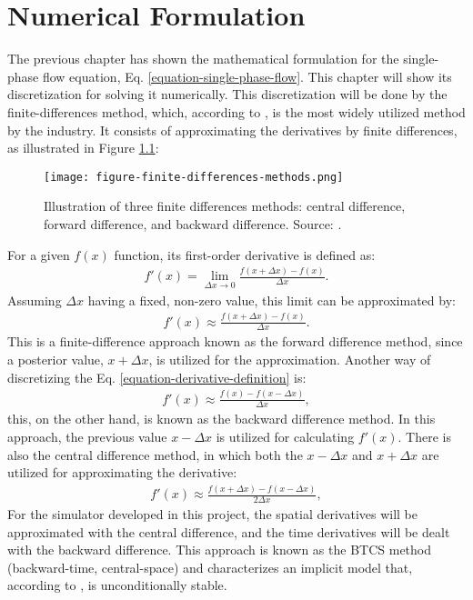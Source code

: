 \chapter{Numerical Formulation}
\label{chapter-numerical-formulation}

The previous chapter has shown the mathematical formulation for the single-phase flow equation, Eq. \ref{equation-single-phase-flow}.
%
This chapter will show its discretization for solving it numerically.
%
This discretization will be done by the finite-differences method, which, according to \cite{Ertekin2001}, is the most widely utilized method by the industry.
%
It consists of approximating the derivatives by finite differences, as illustrated in Figure \ref{figure-finite-differences-methods}:
%
\begin{figure}[H]
	\centering
	\texttt{[image: figure-finite-differences-methods.png]}\\
	\caption{Illustration of three finite differences methods: central difference, forward difference, and backward difference. Source: \cite{Heinzl1977}.}
	\label{figure-finite-differences-methods}
\end{figure}
%
\noindent
For a given $f(x)$ function, its first-order derivative is defined as:
%
\begin{align}
	\label{equation-derivative-definition}
	f'(x) = \lim_{\Delta x \to 0}\frac{f(x+\Delta x)-f(x)}{\Delta x}.
\end{align}
%
Assuming $\Delta x$ having a fixed, non-zero value, this limit can be approximated by:
%
\begin{align}
	\label{equation-forward-difference-method}
	f'(x) \approx \frac{f(x+\Delta x)-f(x)}{\Delta x}.
\end{align}
%
This is a finite-difference approach known as the forward difference method, since a posterior value, $x + \Delta x$, is utilized for the approximation.
%
Another way of discretizing the Eq. \ref{equation-derivative-definition} is:
%
\begin{align}
	\label{equation-backward-difference-method}
	f'(x) \approx \frac{f(x)-f(x - \Delta x)}{\Delta x},
\end{align}
%
this, on the other hand, is known as the backward difference method.
%
In this approach, the previous value $x - \Delta x$ is utilized for calculating $f'(x)$.
%
There is also the central difference method, in which both the $x - \Delta x$ and  $x + \Delta x$ are utilized for approximating the derivative:
%
\begin{align}
	\label{equation-central-difference-method}
	f'(x) \approx \frac{f(x + \Delta x)-f(x - \Delta x)}{2 \Delta x},
\end{align}
%
For the simulator developed in this project, the spatial derivatives will be approximated with the central difference, and the time derivatives will be dealt with the backward difference.
%
This approach is known as the BTCS method (backward-time, central-space) and characterizes an implicit model that, according to \cite{Ertekin2001}, is unconditionally stable.

